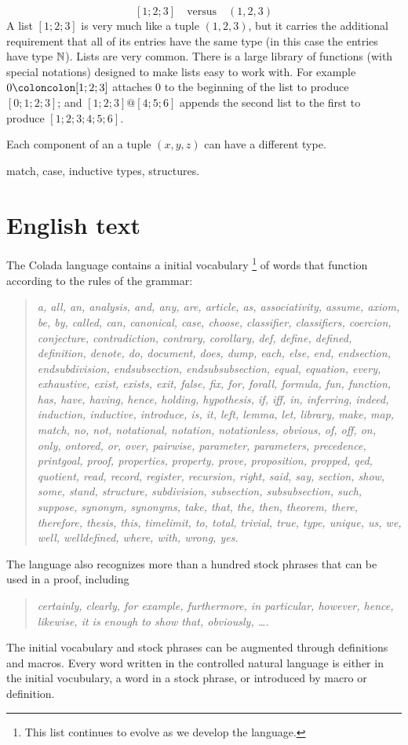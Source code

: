 \documentclass[12pt]{article}
\numberwithin{definition}{section}
\begin{document}
\[
\boxed{[1;2;3]} \quad\text{versus}\quad \boxed{(1,2,3)}
\]
A list $[1;2;3]$ is very much like a tuple $(1,2,3)$, but it
carries the additional requirement that all of its entries have the
same type (in this case the entries have type ${\mathbb N}$).  Lists are very
common.  There is a large library of functions (with special
notations) designed to make lists easy to work with.  For example $0
\coloncolon[1;2;3]$ attaches $0$ to the beginning of the list to
produce $[0;1;2;3]$; and $[1;2;3] @ [4;5;6]$ appends the second list
to the first to produce $[1;2;3;4;5;6]$.

Each component of an a tuple $(x,y,z)$ can have a different type.


match,  case, inductive types, structures.

\section{English text}

The Colada language contains a initial vocabulary%
\footnote{This list continues to evolve as we develop the language.}
%
of words that function according to the rules of the grammar:

\begin{quote}
{\it a, all, an, analysis, and, any, are, article, as, associativity,
assume, axiom, be, by, called, can, canonical, case, choose,
classifier, classifiers, coercion, conjecture, contradiction,
contrary, corollary, def, define, defined, definition, denote, do,
document, does, dump, each, else, end, endsection, endsubdivision,
endsubsection, endsubsubsection, equal, equation, every, exhaustive,
exist, exists, exit, false, fix, for, forall, formula, fun, function,
has, have, having, hence, holding, hypothesis, if, iff, in, inferring,
indeed, induction, inductive, introduce, is, it, left, lemma, let,
library, make, map, match, no, not, notational, notation,
notationless, obvious, of, off, on, only, ontored, or, over, pairwise,
parameter, parameters, precedence, printgoal, proof, properties,
property, prove, proposition, propped, qed, quotient, read, record,
register, recursion, right, said, say, section, show, some, stand,
structure, subdivision, subsection, subsubsection, such, suppose,
synonym, synonyms, take, that, the, then, theorem, there, therefore,
thesis, this, timelimit, to, total, trivial, true, type, unique, us,
we, well, welldefined, where, with, wrong, yes.}
\end{quote}


The language also recognizes more than a hundred stock phrases that
can be used in a proof, including

\begin{quote}
{\it certainly, clearly, for example, furthermore, in particular, however,
hence, likewise, it is enough to show that, obviously, \ldots.}
\end{quote}

The initial vocabulary and stock phrases can be augmented through
definitions and macros.  Every word written in the controlled natural
language is either in the initial vocubulary, a word in a stock
phrase, or introduced by macro or definition.
\end{document}
